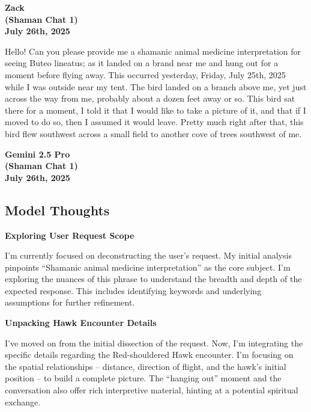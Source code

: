 \documentclass{article}
\begin{document}
\begin{center}
\textbf{Zack} \\
\textbf{(Shaman Chat 1)} \\
\textbf{July 26th, 2025}
\end{center}

\medskip

Hello! Can you please provide me a shamanic animal medicine
interpretation for seeing Buteo lineatus; as it landed on a brand near
me and hung out for a moment before flying away. This occurred
yesterday, Friday, July 25th, 2025 while I was outside near my tent. The
bird landed on a branch above me, yet just across the way from me,
probably about a dozen feet away or so. This bird sat there for a
moment, I told it that I would like to take a picture of it, and that if
I moved to do so, then I assumed it would leave. Pretty much right after
that, this bird flew southwest across a small field to another cove of
trees southwest of me.

\begin{center}
\textbf{Gemini 2.5 Pro} \\
\textbf{(Shaman Chat 1)} \\
\textbf{July 26th, 2025}
\end{center}

\medskip

\subsection*{Model Thoughts}\label{model-thoughts}

\textbf{Exploring User Request Scope}

I'm currently focused on deconstructing the user's request. My initial
analysis pinpoints ``Shamanic animal medicine interpretation'' as the
core subject. I'm exploring the nuances of this phrase to understand the
breadth and depth of the expected response. This includes identifying
keywords and underlying assumptions for further refinement.

\textbf{Unpacking Hawk Encounter Details}

I've moved on from the initial dissection of the request. Now, I'm
integrating the specific details regarding the Red-shouldered Hawk
encounter. I'm focusing on the spatial relationships -- distance,
direction of flight, and the hawk's initial position -- to build a
complete picture. The ``hanging out'' moment and the conversation also
offer rich interpretive material, hinting at a potential spiritual
exchange.
\end{document}
